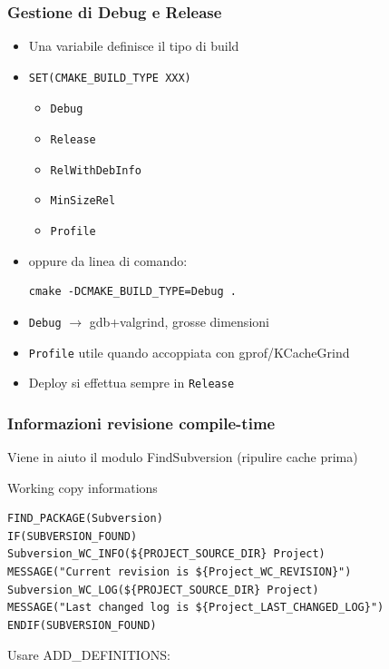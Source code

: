 \documentclass[10pt] {beamer}
\begin{document}

\begin{frame}[fragile]
\frametitle{Gestione di Debug e Release}
\begin{itemize}
\item<1-> Una variabile definisce il tipo di build
\item<2->
\begin{verbatim}
SET(CMAKE_BUILD_TYPE XXX)
\end{verbatim}
    \begin{itemize}
    \item \texttt{Debug}
    \item \texttt{Release}
    \item \texttt{RelWithDebInfo}
    \item \texttt{MinSizeRel}
    \item \texttt{Profile}
    \end{itemize}
\item<3-> oppure da linea di comando:
\begin{verbatim}
cmake -DCMAKE_BUILD_TYPE=Debug .
\end{verbatim}

\item<4-> \texttt{Debug} $\rightarrow$ gdb+valgrind, grosse dimensioni
\item<5-> \texttt{Profile} utile quando accoppiata con gprof/KCacheGrind
\item<6-> Deploy si effettua sempre in \texttt{Release}
\end{itemize}
\end{frame}


\begin{frame}[fragile]
 \frametitle{Informazioni revisione compile-time}
Viene in aiuto il modulo FindSubversion (ripulire cache prima)

\begin{block}{Working copy informations}
\begin{small}
\begin{verbatim}
FIND_PACKAGE(Subversion)
IF(SUBVERSION_FOUND)
Subversion_WC_INFO(${PROJECT_SOURCE_DIR} Project)
MESSAGE("Current revision is ${Project_WC_REVISION}")
Subversion_WC_LOG(${PROJECT_SOURCE_DIR} Project)
MESSAGE("Last changed log is ${Project_LAST_CHANGED_LOG}")
ENDIF(SUBVERSION_FOUND)
\end{verbatim}
\end{small}
\end{block}

Usare ADD\_DEFINITIONS:


\end{frame}
\end{document}
